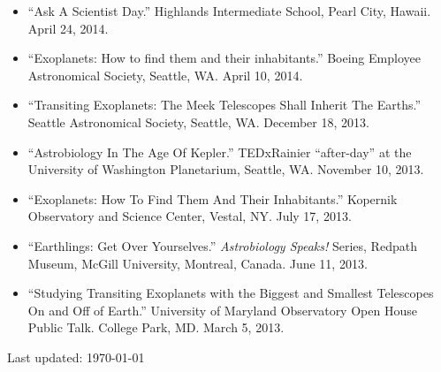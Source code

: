 \documentclass[margin]{res}
\begin{document}
\begin{resume}
\begin{itemize}
\item ``Ask A Scientist Day.'' Highlands Intermediate School, Pearl City, Hawaii. April 24, 2014.

\item ``Exoplanets: How to find them and their inhabitants.'' Boeing Employee Astronomical Society, Seattle, WA. April 10, 2014.

\item ``Transiting Exoplanets: The Meek Telescopes Shall Inherit The Earths.'' Seattle Astronomical Society, Seattle, WA. December 18, 2013.

\item ``Astrobiology In The Age Of Kepler.'' TEDxRainier ``after-day'' at the University of Washington Planetarium, Seattle, WA. November 10, 2013. 

\item ``Exoplanets: How To Find Them And Their Inhabitants.'' Kopernik Observatory and Science Center, Vestal, NY. July 17, 2013. 

\item ``Earthlings: Get Over Yourselves.'' \textit{Astrobiology Speaks!} Series, Redpath Museum, McGill University, Montreal, Canada. June 11, 2013.

\item ``Studying Transiting Exoplanets with the Biggest and Smallest Telescopes On and Off of Earth.'' University of Maryland Observatory Open House Public Talk. College Park, MD. March 5, 2013.
\end{itemize}
            
\vfill \hfill {\small Last updated: \today}
\end{resume}
\end{document}
